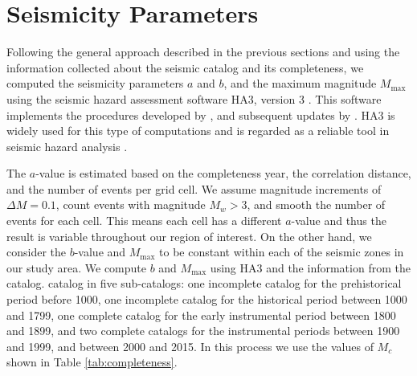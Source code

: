 
\section{Seismicity Parameters}
\label{sec:params}

Following the general approach described in the previous sections and using the information collected about the seismic catalog and its completeness, we computed the seismicity parameters $a$ and $b$, and the maximum magnitude $M_{\max}$ using the seismic hazard assessment software HA3, version 3 \citep{Kijko_2004_HA3}. This software implements the procedures developed by \citet{Kijko_1989_BSSA, Kijko_1992_BSSA}, and subsequent updates by \citet{Kijko_2004_PAG}. HA3 is widely used for this type of computations and is regarded as a reliable tool in seismic hazard analysis \citep[see, for instance,][]{Karimiparidari2013, Khodaverdian_2016_BSSA}.

The $a$-value is estimated based on the completeness year, the correlation distance, and the number of events per grid cell. We assume magnitude increments of $\Delta M = 0.1$, count events with magnitude $M_w > 3$, and smooth the number of events for each cell. This means each cell has a different $a$-value and thus the result is variable throughout our region of interest. On the other hand, we consider the $b$-value and $M_{\max}$ to be constant within each of the seismic zones in our study area. We compute $b$ and $M_{\max}$ using HA3 and the information from the catalog.  catalog in five sub-catalogs: one incomplete catalog for the prehistorical period before 1000, one incomplete catalog for the historical period between 1000 and 1799, one complete catalog for the early instrumental period between 1800 and 1899, and two complete catalogs for the instrumental periods between 1900 and 1999, and between 2000 and 2015. In this process we use the values of $M_c$ shown in Table \ref{tab:completeness}. 

